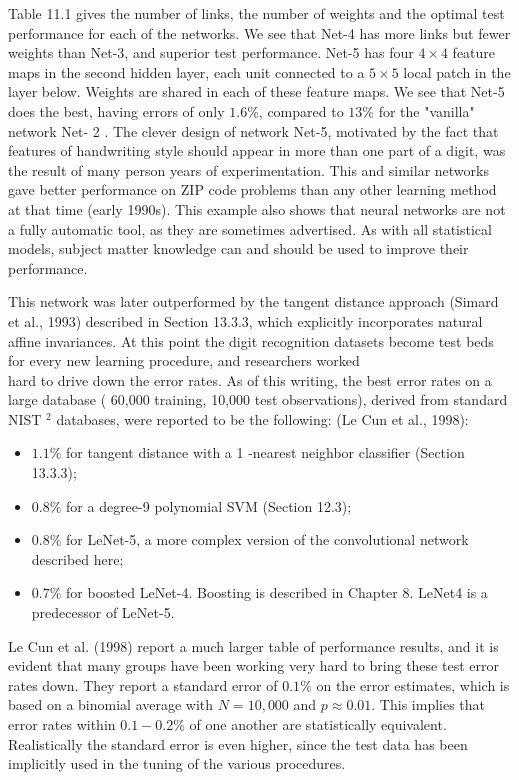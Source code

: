 \documentclass[10pt]{article}
\begin{document}
Table 11.1 gives the number of links, the number of weights and the optimal test performance for each of the networks. We see that Net-4 has more links but fewer weights than Net-3, and superior test performance. Net-5 has four $4 \times 4$ feature maps in the second hidden layer, each unit connected to a $5 \times 5$ local patch in the layer below. Weights are shared in each of these feature maps. We see that Net-5 does the best, having errors of only $1.6 \%$, compared to $13 \%$ for the "vanilla" network Net- 2 . The clever design of network Net-5, motivated by the fact that features of handwriting style should appear in more than one part of a digit, was the result of many person years of experimentation. This and similar networks gave better performance on ZIP code problems than any other learning method at that time (early 1990s). This example also shows that neural networks are not a fully automatic tool, as they are sometimes advertised. As with all statistical models, subject matter knowledge can and should be used to improve their performance.

This network was later outperformed by the tangent distance approach (Simard et al., 1993) described in Section 13.3.3, which explicitly incorporates natural affine invariances. At this point the digit recognition datasets become test beds for every new learning procedure, and researchers worked\\
hard to drive down the error rates. As of this writing, the best error rates on a large database ( 60,000 training, 10,000 test observations), derived from standard NIST ${ }^{2}$ databases, were reported to be the following: (Le Cun et al., 1998):

\begin{itemize}
  \item $1.1 \%$ for tangent distance with a 1 -nearest neighbor classifier (Section 13.3.3);
  \item $0.8 \%$ for a degree-9 polynomial SVM (Section 12.3);
  \item $0.8 \%$ for LeNet-5, a more complex version of the convolutional network described here;
  \item $0.7 \%$ for boosted LeNet-4. Boosting is described in Chapter 8. LeNet4 is a predecessor of LeNet-5.
\end{itemize}

Le Cun et al. (1998) report a much larger table of performance results, and it is evident that many groups have been working very hard to bring these test error rates down. They report a standard error of $0.1 \%$ on the error estimates, which is based on a binomial average with $N=10,000$ and $p \approx 0.01$. This implies that error rates within $0.1-0.2 \%$ of one another are statistically equivalent. Realistically the standard error is even higher, since the test data has been implicitly used in the tuning of the various procedures.
\end{document}
